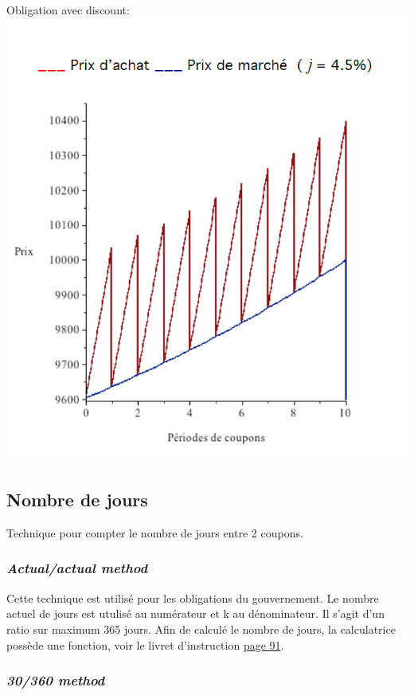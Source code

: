 \documentclass[11pt,french]{report}
\begin{document}
Obligation avec discount:
\\
\includegraphics[scale=0.40]{picture17.PNG} 

\subsection{Nombre de jours}
\label{sex:nombre de jours}

Technique pour compter le nombre de jours entre 2 coupons. 

\subsubsection{\emph{Actual/actual method}}

Cette technique est utilisé pour les obligations du gouvernement. Le nombre actuel de jours est utulisé au numérateur et k au dénominateur. Il s'agit d'un ratio sur maximum 365 jours. Afin de calculé le nombre de jours, la calculatrice possède une fonction, voir le livret d'instruction \href{https://drive.google.com/open?id=0B6kXivc6X9LIMXI4T1QtcTFQNzA}{page 91}.

\subsubsection{\emph{30/360 method}}
\end{document}
